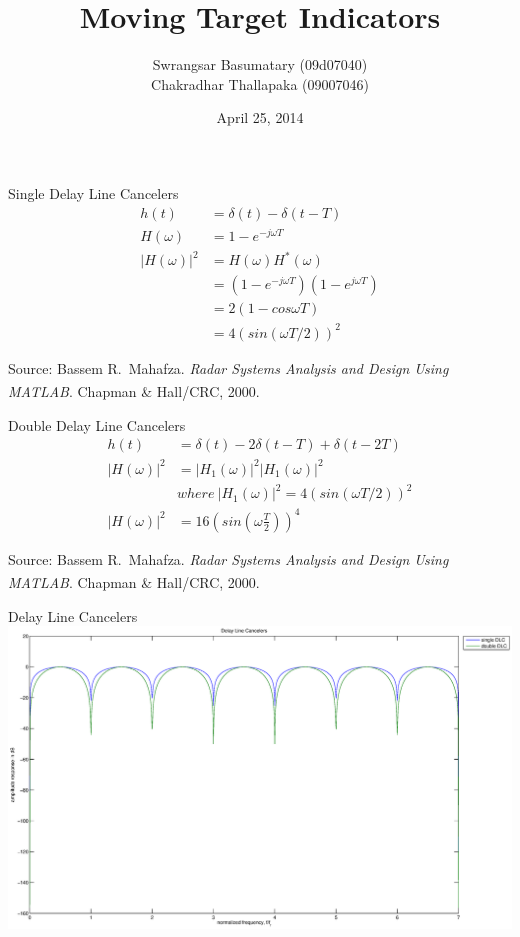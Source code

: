 \documentclass[mathserif]{beamer}
\title{Moving Target Indicators}
\author{Swrangsar Basumatary (09d07040) \\ Chakradhar Thallapaka (09007046)}
\institute{Department of Electrical Engineering \\ IIT Bombay, Powai}
\date{April 25, 2014}
\begin{document}
    \frame{\titlepage}
    
    \begin{frame}{Single Delay Line Cancelers}
    	\begin{align}
    	 h(t) & = \delta(t) - \delta(t-T) \nonumber \\
    	 H(\omega) & = 1 - e^{-j\omega T} \nonumber \\
    	 |H(\omega)|^2 & = H(\omega)H^*(\omega) \nonumber \\
    	 & = (1 - e^{-j\omega T})(1 - e^{j\omega T}) \nonumber \\
    	 & = 2(1-cos\omega T) \nonumber \\
    	 & = 4(sin(\omega T/2))^2 \nonumber
    	\end{align}
    	
    	\vfill
    	\tiny{Source: Bassem R.~Mahafza. \emph{Radar Systems Analysis and Design Using MATLAB\textsuperscript{\textregistered}}. Chapman \& Hall/CRC, 2000.}

    \end{frame}
    
    
    \begin{frame}{Double Delay Line Cancelers}
      \begin{align}
       h(t) & = \delta(t) - 2\delta(t-T) + \delta(t-2T) \nonumber \\
       |H(\omega)|^2 & = |H_1(\omega)|^2|H_1(\omega)|^2 \nonumber \\
       & where~ |H_1(\omega)|^2 = 4(sin(\omega T/2))^2 \nonumber \\
       |H(\omega)|^2 & = 16\left(sin\left(\omega\frac{T}{2}\right)\right)^4 \nonumber
      \end{align}

      \vfill
    	\tiny{Source: Bassem R.~Mahafza. \emph{Radar Systems Analysis and Design Using MATLAB\textsuperscript{\textregistered}}. Chapman \& Hall/CRC, 2000.}

    \end{frame}

    
    \begin{frame}{Delay Line Cancelers}
    	\includegraphics[width=\linewidth]{delayLineCancelers}
    \end{frame}
    
\end{document}
